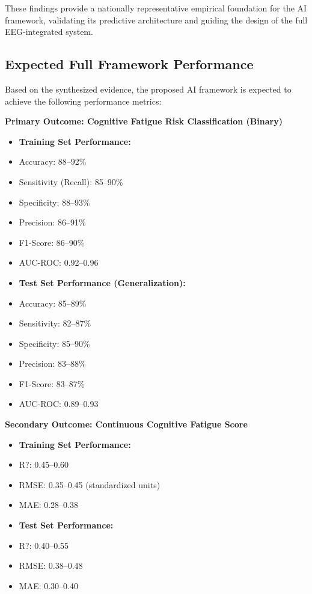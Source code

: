 \documentclass[journal,twoside,10pt]{IEEEtran}
\begin{document}
These findings provide a nationally representative empirical foundation for the AI framework, validating its predictive architecture and guiding the design of the full EEG-integrated system.


\subsection{Expected Full Framework Performance}

Based on the synthesized evidence, the proposed AI framework is expected to achieve the following performance metrics:

\textbf{Primary Outcome: Cognitive Fatigue Risk Classification (Binary)}
\begin{itemize}
\item \textbf{Training Set Performance:}
\item Accuracy: 88--92\%
\item Sensitivity (Recall): 85--90\%
\item Specificity: 88--93\%
\item Precision: 86--91\%
\item F1-Score: 86--90\%
\item AUC-ROC: 0.92--0.96
\item \textbf{Test Set Performance (Generalization):}
\item Accuracy: 85--89\%
\item Sensitivity: 82--87\%
\item Specificity: 85--90\%
\item Precision: 83--88\%
\item F1-Score: 83--87\%
\item AUC-ROC: 0.89--0.93
\end{itemize}

\textbf{Secondary Outcome: Continuous Cognitive Fatigue Score}
\begin{itemize}
\item \textbf{Training Set Performance:}
\item R?: 0.45--0.60
\item RMSE: 0.35--0.45 (standardized units)
\item MAE: 0.28--0.38
\item \textbf{Test Set Performance:}
\item R?: 0.40--0.55
\item RMSE: 0.38--0.48
\item MAE: 0.30--0.40
\end{itemize}
\end{document}
